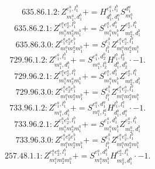 \documentclass[letterpaper,10pt,fleqn,leqno,onecolumn]{article}
\begin{document}
\begin{equation} \;\;\;\;\;\;  635.86.1.2: Z^{e_{1}^{a},l_{1}^{b}}_{m_{1}^{a},d_{1}^{b}}+=H^{e_{1}^{a},l_{1}^{b}}_{d_{1}^{b},d_{1}^{a}}S^{d_{1}^{a}}_{m_{1}^{a}} \end{equation}
\begin{equation} \;\;\;\;\;\;  635.86.2.1: Z^{e_{1}^{a}e_{2}^{a},l_{1}^{b}}_{m_{1}^{a}m_{2}^{a}m_{1}^{b}}+=S^{e_{1}^{a},d_{1}^{b}}_{m_{1}^{a}m_{1}^{b}}Z^{e_{2}^{a},l_{1}^{b}}_{m_{2}^{a},d_{1}^{b}} \end{equation}
\begin{equation} \;\;\;\;\;\;  635.86.3.0: Z^{e_{1}^{a}e_{2}^{a}e_{1}^{b}}_{m_{1}^{a}m_{2}^{a}m_{1}^{b}}+=S^{e_{1}^{b}}_{l_{1}^{b}}Z^{e_{1}^{a}e_{2}^{a},l_{1}^{b}}_{m_{1}^{a}m_{2}^{a}m_{1}^{b}} \end{equation}
\begin{equation} \;\;\;\;\;\;  729.96.1.2: Z^{e_{1}^{a},l_{1}^{b}}_{m_{1}^{a},d_{1}^{b}}+=S^{e_{1}^{a},d_{2}^{b}}_{m_{1}^{a},l_{2}^{b}}H^{l_{1}^{b},l_{2}^{b}}_{d_{1}^{b},d_{2}^{b}}\cdot -1. \end{equation}
\begin{equation} \;\;\;\;\;\;  729.96.2.1: Z^{e_{1}^{a}e_{2}^{a},l_{1}^{b}}_{m_{1}^{a}m_{2}^{a}m_{1}^{b}}+=S^{e_{1}^{a},d_{1}^{b}}_{m_{1}^{a}m_{1}^{b}}Z^{e_{2}^{a},l_{1}^{b}}_{m_{2}^{a},d_{1}^{b}} \end{equation}
\begin{equation} \;\;\;\;\;\;  729.96.3.0: Z^{e_{1}^{a}e_{2}^{a}e_{1}^{b}}_{m_{1}^{a}m_{2}^{a}m_{1}^{b}}+=S^{e_{1}^{b}}_{l_{1}^{b}}Z^{e_{1}^{a}e_{2}^{a},l_{1}^{b}}_{m_{1}^{a}m_{2}^{a}m_{1}^{b}} \end{equation}
\begin{equation} \;\;\;\;\;\;  733.96.1.2: Z^{e_{1}^{a},l_{1}^{b}}_{m_{1}^{a},d_{1}^{b}}+=S^{e_{1}^{a},d_{1}^{a}}_{m_{1}^{a},l_{1}^{a}}H^{l_{1}^{b},l_{1}^{a}}_{d_{1}^{b},d_{1}^{a}}\cdot -1. \end{equation}
\begin{equation} \;\;\;\;\;\;  733.96.2.1: Z^{e_{1}^{a}e_{2}^{a},l_{1}^{b}}_{m_{1}^{a}m_{2}^{a}m_{1}^{b}}+=S^{e_{1}^{a},d_{1}^{b}}_{m_{1}^{a}m_{1}^{b}}Z^{e_{2}^{a},l_{1}^{b}}_{m_{2}^{a},d_{1}^{b}} \end{equation}
\begin{equation} \;\;\;\;\;\;  733.96.3.0: Z^{e_{1}^{a}e_{2}^{a}e_{1}^{b}}_{m_{1}^{a}m_{2}^{a}m_{1}^{b}}+=S^{e_{1}^{b}}_{l_{1}^{b}}Z^{e_{1}^{a}e_{2}^{a},l_{1}^{b}}_{m_{1}^{a}m_{2}^{a}m_{1}^{b}} \end{equation}
\begin{equation} \;\;\;\;\;\;  257.48.1.1: Z^{e_{1}^{a}e_{2}^{a},l_{1}^{b}}_{m_{1}^{a}m_{2}^{a}m_{1}^{b}}+=S^{e_{1}^{a},d_{1}^{b}}_{m_{1}^{a}m_{1}^{b}}H^{e_{2}^{a},l_{1}^{b}}_{m_{2}^{a},d_{1}^{b}}\cdot -1. \end{equation}
\end{document}
